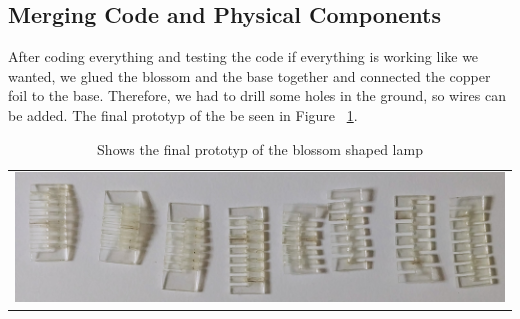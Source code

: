 \documentclass[doc.tex]{subfiles}
\begin{document}
    \subsection{Merging Code and Physical Components}
        \begin{flushleft}
            After coding everything and testing the code if everything is working like we wanted, we glued
            the blossom and the base together and connected the copper foil to the base. Therefore, we had 
            to drill some holes in the ground, so wires can be added. The final prototyp of the be seen in 
            Figure ~\ref{fig:finalPrototyp}.
        \end{flushleft}

        \begin{table}[h!]
            \centering
            \begin{tabular}{c}
              \centering
              \includegraphics[width=.8\linewidth]{images/process/01_LaserCut.jpg}
            \end{tabular}
            \caption{Shows the final prototyp of the blossom shaped lamp}
            \label{fig:finalPrototyp}
        \end{table}
\end{document}
